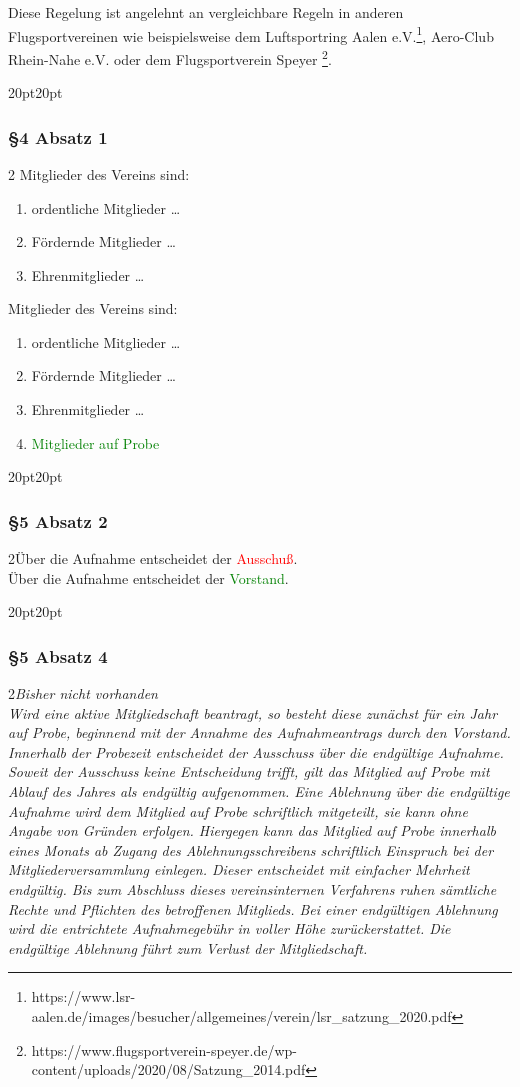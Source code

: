\documentclass[10pt,a4paper,parskip=half]{scrartcl}
\newcommand{\new}[1]{\textcolor{Green}{#1}}
\newcommand{\old}[1]{\textcolor{Red}{#1}}
\newcommand{\change}[1]{
  \begin{adjustwidth}{20pt}{20pt}
    #1
  \end{adjustwidth}
}
\newcommand{\compare}[3]{\change{\subsubsection*{#1}\begin{multicols}{2}#2\columnbreak\\#3\end{multicols}}}
\begin{document}
Diese Regelung ist angelehnt an vergleichbare Regeln in anderen Flugsportvereinen wie beispielsweise dem Luftsportring Aalen e.V.\footnote{https://www.lsr-aalen.de/images/besucher/allgemeines/verein/lsr\_satzung\_2020.pdf}, Aero-Club Rhein-Nahe e.V. oder dem Flugsportverein Speyer \footnote{https://www.flugsportverein-speyer.de/wp-content/uploads/2020/08/Satzung\_2014.pdf}.

\change{
  \subsubsection*{§4 Absatz 1}
  \begin{multicols}{2}
    Mitglieder des Vereins sind:
    \begin{enumerate}[noitemsep]
      \item ordentliche Mitglieder \dots
      \item Fördernde Mitglieder \dots
      \item Ehrenmitglieder \dots
    \end{enumerate}
    \columnbreak
    Mitglieder des Vereins sind:
    \begin{enumerate}[noitemsep]
      \item ordentliche Mitglieder \dots
      \item Fördernde Mitglieder \dots
      \item Ehrenmitglieder \dots
      \item \new{Mitglieder auf Probe}
    \end{enumerate}
  \end{multicols}
}

\compare{§5 Absatz 2}{Über die Aufnahme entscheidet der \old{Ausschuß}.}{Über die Aufnahme entscheidet der \new{Vorstand}.}
\clearpage
\compare{§5 Absatz 4}{\em Bisher nicht vorhanden \em}{Wird eine aktive Mitgliedschaft beantragt,
  so besteht diese zunächst für ein Jahr auf Probe,
  beginnend mit der Annahme des Aufnahmeantrags durch den Vorstand.
  Innerhalb der Probezeit entscheidet der Ausschuss über die endgültige Aufnahme.
  Soweit der Ausschuss keine Entscheidung trifft,
  gilt das Mitglied auf Probe mit Ablauf des Jahres als endgültig aufgenommen.
  Eine Ablehnung über die endgültige Aufnahme wird dem Mitglied auf Probe schriftlich mitgeteilt,
  sie kann ohne Angabe von Gründen erfolgen.
  Hiergegen kann das Mitglied auf Probe innerhalb eines Monats ab Zugang des Ablehnungsschreibens schriftlich Einspruch bei der Mitgliederversammlung einlegen.
  Dieser entscheidet mit einfacher Mehrheit endgültig.
  Bis zum Abschluss dieses vereinsinternen Verfahrens ruhen sämtliche Rechte und Pflichten des betroffenen Mitglieds.
  Bei einer endgültigen Ablehnung wird die entrichtete Aufnahmegebühr in voller Höhe zurückerstattet.
  Die endgültige Ablehnung führt zum Verlust der Mitgliedschaft.}
\end{document}
